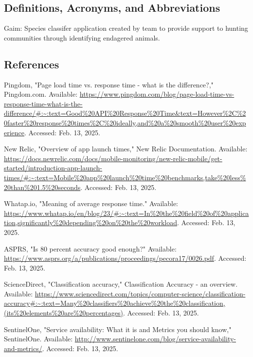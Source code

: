 \documentclass[]{article}
\begin{document}
\subsection{Definitions, Acronyms, and Abbreviations}
\label{sub:definitions_acronyms_and_abbreviations}
Gaim: Species classifer application created by team to provide support to hunting communities through identifying endagered animals. 

\subsection{References}
\label{sub:references}
\begin{thebibliography}{9}
     Pingdom, "Page load time vs. response time - what is the difference?," Pingdom.com. Available: \url{https://www.pingdom.com/blog/page-load-time-vs-response-time-what-is-the-difference/#:~:text=Good%20API%20Response%20Time&text=However%2C%20faster%20response%20times%2C%20ideally,and%20a%20smooth%20user%20experience}. Accessed: Feb. 13, 2025.

     New Relic, "Overview of app launch times," New Relic Documentation. Available: \url{https://docs.newrelic.com/docs/mobile-monitoring/new-relic-mobile/get-started/introduction-app-launch-times/#:~:text=Mobile%20app%20launch%20time%20benchmarks,take%20less%20than%201.5%20seconds}. Accessed: Feb. 13, 2025.
    
     Whatap.io, "Meaning of average response time." Available: \url{https://www.whatap.io/en/blog/23/#:~:text=In%20the%20field%20of%20application,significantly%20depending%20on%20the%20workload}. Accessed: Feb. 13, 2025.
    
     ASPRS, "Is 80 percent accuracy good enough?" Available: \url{https://www.asprs.org/a/publications/proceedings/pecora17/0026.pdf}. Accessed: Feb. 13, 2025.
    
     ScienceDirect, "Classification accuracy," Classification Accuracy - an overview. Available: \url{https://www.sciencedirect.com/topics/computer-science/classification-accuracy#:~:text=Many%20classifiers%20achieve%20the%20classification,(its%20elements%20are%20percentages)}. Accessed: Feb. 13, 2025.
    
     SentinelOne, "Service availability: What it is and Metrics you should know," SentinelOne. Available: \url{http://www.sentinelone.com/blog/service-availability-and-metrics/}. Accessed: Feb. 13, 2025.    


\end{thebibliography}
\end{document}
